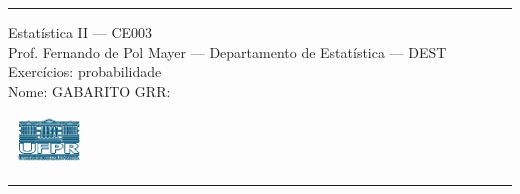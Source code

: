 \documentclass[a4paper,11pt,fleqn]{article}\usepackage[]{graphicx}\usepackage[]{color}
\theoremstyle{definition}
\begin{document}
\reversemarginpar %





\hrule
\vspace{0.3cm}

\begin{minipage}[c]{.85\textwidth}
  Estatística II --- CE003 \\
  Prof. Fernando de Pol Mayer --- Departamento de Estatística --- DEST \\
  Exercícios: probabilidade \\
  Nome: GABARITO  \hfill GRR: \hspace{2cm}
\end{minipage}\hfill
\begin{minipage}[c]{.15\textwidth}
\flushright
\includegraphics[width=2.2cm]{../img/ufpr-logo.png}
\end{minipage}

\vspace{0.3cm}
\hrule
\vspace{0.3cm}
\end{document}
